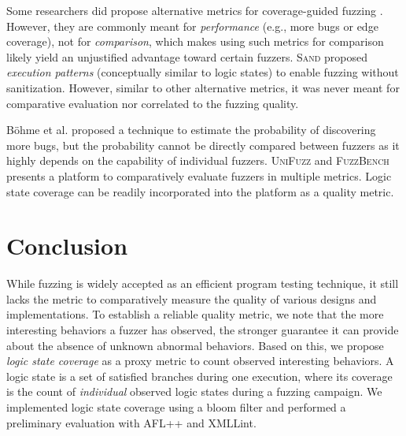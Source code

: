 \documentclass[letterpaper,twocolumn,10pt]{article}
\begin{document}
%
Some researchers did propose alternative metrics for coverage-guided fuzzing
\cite{wang2020notallcov,wang2019impactcov,yan2020pathafl,gan2020greyone,gan2018collafl}.
However, they are commonly meant for \emph{performance} (e.g., more bugs or edge
coverage), not for \emph{comparison}, which makes using such metrics for
comparison likely yield an unjustified advantage toward certain fuzzers.
%
\textsc{Sand} \cite{kong2024sand} proposed \emph{execution patterns}
(conceptually similar to logic states) to enable fuzzing without sanitization.
However, similar to other alternative metrics, it was never meant for
comparative evaluation nor correlated to the fuzzing quality. 

%
B\"{o}hme et al. \cite{bohme2021residual} proposed a technique to estimate the
probability of discovering more bugs,
but the probability cannot be directly compared between fuzzers as it highly
depends on the capability of individual fuzzers.
%
\textsc{UniFuzz} \cite{li2021unifuzz} and \textsc{FuzzBench}
\cite{metzman2021fuzzbench} presents a platform to comparatively evaluate
fuzzers in multiple metrics. 
%
Logic state coverage can be readily incorporated into the platform as a quality
metric.



\section{Conclusion}

While fuzzing is widely accepted as an efficient program testing technique, 
it still lacks the metric to comparatively measure the quality of various
designs and implementations. To establish a reliable quality metric, we
note that the more interesting behaviors a fuzzer has observed, the stronger
guarantee it can provide about the absence of unknown abnormal behaviors. Based
on this, we propose \emph{logic state coverage} as a proxy metric to count
observed interesting behaviors. A logic state is a set of satisfied branches
during one execution, where its coverage is the count of \emph{individual}
observed logic states during a fuzzing campaign. We implemented logic state
coverage using a bloom filter and performed a preliminary evaluation with AFL++
and XMLLint.
\end{document}
